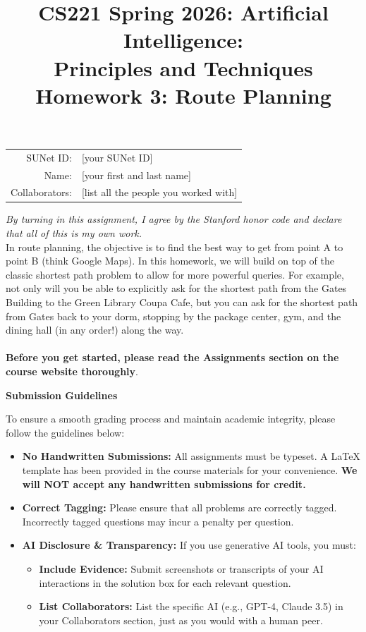 \documentclass{article}
\title{\textbf{CS221 Spring 2026: Artificial Intelligence:\\ Principles and Techniques} \\Homework 3: Route Planning}
\date{}
\theoremstyle{case}
\theoremstyle{definition}
\begin{document}
\maketitle

\begin{center}
\begin{tabular}{rl}
SUNet ID: & [your SUNet ID] \\
Name: & [your first and last name] \\
Collaborators: & [list all the people you worked with]
\end{tabular}
\end{center}
\textit{By turning in this assignment, I agree by the Stanford honor code and declare
that all of this is my own work.} \\
\fontsize{12pt}{16pt}\selectfont
In route planning, the objective is to find the best way to get from point A to point B (think Google Maps).
  In this homework, we will build on top of the classic shortest path problem to allow for more powerful queries. For
  example, not only will you be able to explicitly ask for the shortest path from the Gates Building to the Green Library Coupa Cafe, but you can ask for the shortest path from Gates back to your dorm, stopping by the package center,
  gym, and the dining hall (in any order!) along the way. \\
  \\
\textbf{Before you get started, please read the Assignments section on the course website thoroughly}.

\textbf{Submission Guidelines}

To ensure a smooth grading process and maintain academic integrity, please follow the guidelines below:

\begin{itemize}
    \item \textbf{No Handwritten Submissions:} All assignments must be typeset. A \LaTeX{} template has been provided in the course materials for your convenience. \textbf{We will NOT accept any handwritten submissions for credit.}
    
    \item \textbf{Correct Tagging:} Please ensure that all problems are correctly tagged. Incorrectly tagged questions may incur a penalty per question.
    
    \item \textbf{AI Disclosure \& Transparency:} If you use generative AI tools, you must:
    \begin{itemize}
        \item \textbf{Include Evidence:} Submit screenshots or transcripts of your AI interactions in the solution box for each relevant question.
        
        \item \textbf{List Collaborators:} List the specific AI (e.g., GPT-4, Claude 3.5) in your Collaborators section, just as you would with a human peer.
    \end{itemize}
\end{itemize}
\end{document}
